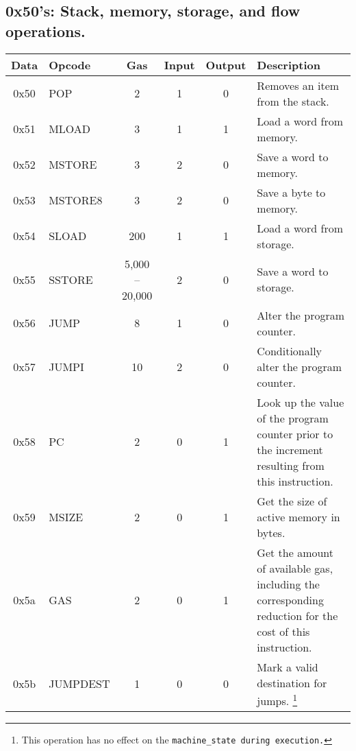 \documentclass[10pt,a4paper,leqno,bibliography=totoc]{scrartcl}
\newenvironment{alphafootnotes}
{\par\edef\savedfootnotenumber{\number\value{footnote}}
\renewcommand{\thefootnote}{\alph{footnote}}
\setcounter{footnote}{0}}
{\par\setcounter{footnote}{\savedfootnotenumber}}
\begin{document}
\begin{alphafootnotes}
		\subsection{0x50's: Stack, memory, storage, and flow operations.}
			\begin{longtable}{|cP{2.8cm}cccp{6cm}|}
			\hline
			\textbf{Data} & \textbf{Opcode} & \textbf{Gas}  & \textbf{Input}  & \textbf{Output} & \textbf{Description} \\
			\hline
			0x50 & POP & 2 & 1 & 0 & Removes an item from the stack. \\
			0x51 & MLOAD & 3 & 1 & 1 & Load a word from memory. \\
			0x52 & MSTORE & 3 & 2 & 0 & Save a word to memory. \\
			0x53 & MSTORE8 & 3 & 2 & 0 & Save a byte to memory. \\
			0x54 & SLOAD & 200 & 1 & 1 & Load a word from storage. \\
			0x55 & SSTORE & 5,000 -- 20,000 & 2 & 0 & Save a word to storage.\\
			0x56 & JUMP & 8 & 1 & 0 & Alter the program counter. \\
			0x57 & JUMPI & 10 & 2 & 0 & Conditionally alter the program counter. \\
			0x58 & PC & 2 & 0 & 1 & Look up the value of the program counter prior to the increment resulting from this instruction. \\
			0x59 & MSIZE & 2 & 0 & 1 & Get the size of active memory in bytes. \\
			0x5a & GAS & 2 & 0 & 1 & Get the amount of available gas, including the corresponding reduction for the cost of this instruction. \\
			0x5b & JUMPDEST & 1 & 0 & 0 & Mark a valid destination for jumps. \footnote{This operation has no effect on the \texttt{machine\_state during execution.}} \\
			\hline
			\end{longtable}


\end{alphafootnotes}
\end{document}
